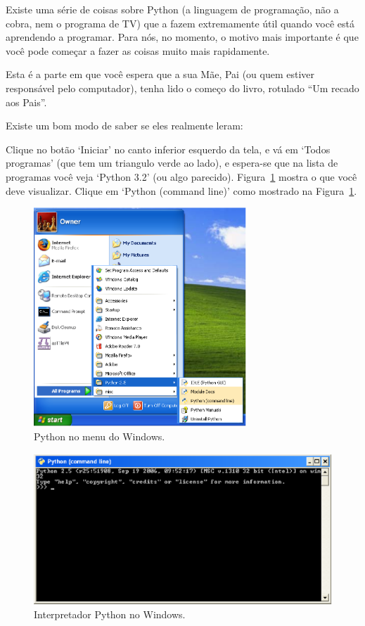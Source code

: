 Existe uma série de coisas sobre Python (a linguagem de programação, não a cobra, nem o programa de TV) que a fazem extremamente útil quando você está aprendendo a programar. Para nós, no momento, o motivo mais importante é que você pode começar a fazer as coisas muito mais rapidamente.

Esta é a parte em que você espera que a sua Mãe, Pai (ou quem estiver responsável pelo computador), tenha lido o começo do livro, rotulado ``Um recado aos Pais''.

\noindent
Existe um bom modo de saber se eles realmente leram:

\begin{WINDOWS}
Clique no botão `Iniciar' no canto inferior esquerdo da tela, e vá em `Todos programas' (que tem um triangulo verde ao lado), e espera-se que na lista de programas você veja `Python 3.2' (ou algo parecido). Figura~\ref{fig1} mostra o que você deve visualizar. Clique em `Python (command line)' como mostrado na Figura~\ref{fig1}.

\begin{figure}
\begin{center}
\includegraphics[width=80mm]{eps/figure1.eps}
\end{center}
\caption{Python no menu do Windows.}\label{fig1}
\end{figure}

\begin{figure}
\begin{center}
\includegraphics[width=135mm]{eps/figure2.eps}
\end{center}
\caption{Interpretador Python no Windows.}\label{fig2}
\end{figure}
\end{WINDOWS}

